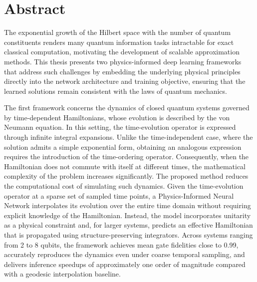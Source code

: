 \chapter*{Abstract}

The exponential growth of the Hilbert space with the number of quantum constituents renders many quantum information tasks intractable for exact classical computation, motivating the development of scalable approximation methods. This thesis presents two physics-informed deep learning frameworks that address such challenges by embedding the underlying physical principles directly into the network architecture and training objective, ensuring that the learned solutions remain consistent with the laws of quantum mechanics.

The first framework concerns the dynamics of closed quantum systems governed by time-dependent Hamiltonians, whose evolution is described by the von Neumann equation. In this setting, the time-evolution operator is expressed through infinite integral expansions. Unlike the time-independent case, where the solution admits a simple exponential form, obtaining an analogous expression requires the introduction of the time-ordering operator. Consequently, when the Hamiltonian does not commute with itself at different times, the mathematical complexity of the problem increases significantly. The proposed method reduces the computational cost of simulating such dynamics. Given the time-evolution operator at a sparse set of sampled time points, a Physics-Informed Neural Network interpolates its evolution over the entire time domain without requiring explicit knowledge of the Hamiltonian. Instead, the model incorporates unitarity as a physical constraint and, for larger systems, predicts an effective Hamiltonian that is propagated using structure-preserving integrators. Across systems ranging from 2 to 8 qubits, the framework achieves mean gate fidelities close to 0.99, accurately reproduces the dynamics even under coarse temporal sampling, and delivers inference speedups of approximately one order of magnitude compared with a geodesic interpolation baseline.

